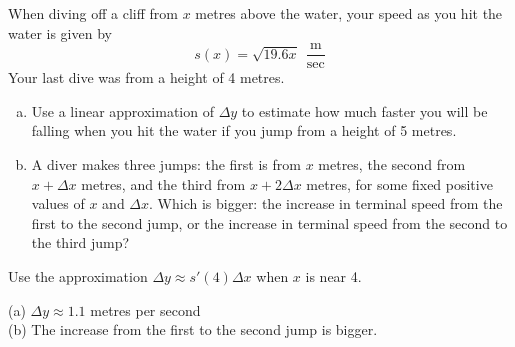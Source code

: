 \begin{question}
When diving off a cliff from $x$ metres above the water, your speed as you hit the water is given by
\[s(x)=\sqrt{19.6x}~~\frac{\mathrm{m}}{\mathrm{sec}}\]
Your last dive was from a height of 4 metres.
\begin{enumerate}[(a)]
\item Use a linear approximation of $\Delta y$
to estimate how much faster you will be falling when you hit the water if you jump from a height of 5 metres.
\item A diver makes three jumps: the first is from $x$ metres, the second from
$x+\Delta x$ metres, and the third from
 $x+2\Delta x$ metres, for some fixed positive values of $x$ and $\Delta x$.
Which is bigger: the increase in terminal speed from the first to the second jump, or the increase in terminal speed from the second to the third jump?
\end{enumerate}
\end{question}
\begin{hint}
Use the approximation $\Delta y \approx s'(4)\Delta x$ when $x$ is near 4.
\end{hint}
\begin{answer}
(a) $\Delta y \approx 1.1$ metres per second\\
(b) The increase from the first to the second jump is bigger.
\end{answer}
